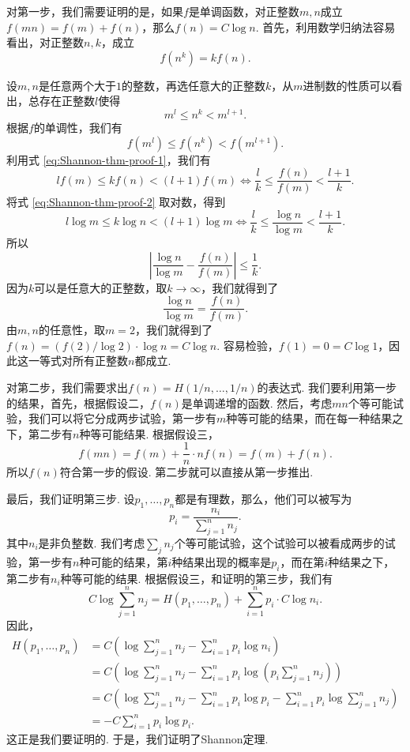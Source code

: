 对第一步，我们需要证明的是，如果$f$是单调函数，对正整数$m,n$成立$f(mn)=f(m)+f(n)$，那么$f(n)=C\log n$. 首先，利用数学归纳法容易看出，对正整数$n,k$，成立
\begin{equation}
    f(n^k)=kf(n).\label{eq:Shannon-thm-proof-1}
\end{equation}

设$m,n$是任意两个大于$1$的整数，再选任意大的正整数$k$，从$m$进制数的性质可以看出，总存在正整数$l$使得
\begin{equation}
    m^l\leq n^k < m^{l+1}.\label{eq:Shannon-thm-proof-2}
\end{equation}
根据$f$的单调性，我们有
\[
    f(m^l)\leq f(n^k) < f(m^{l+1}).
\]
利用式 \eqref{eq:Shannon-thm-proof-1}，我们有
\[
    lf(m)\leq kf(n) < (l+1)f(m)\iff \frac{l}{k}\leq \frac{f(n)}{f(m)} < \frac{l+1}{k}.
\]
将式 \eqref{eq:Shannon-thm-proof-2} 取对数，得到
\[
    l\log m\leq k\log n < (l+1)\log m\iff \frac{l}{k}\leq \frac{\log n}{\log m} < \frac{l+1}{k}.
\]
所以
\[
    \left|\frac{\log n}{\log m}-\frac{f(n)}{f(m)}\right|\leq\frac1k.
\]
因为$k$可以是任意大的正整数，取$k\to\infty$，我们就得到了
\[
    \frac{\log n}{\log m}=\frac{f(n)}{f(m)}.
\]
由$m,n$的任意性，取$m=2$，我们就得到了$f(n)=(f(2)/\log 2)\cdot \log n= C\log n$. 容易检验，$f(1)=0=C\log 1$，因此这一等式对所有正整数$n$都成立.

对第二步，我们需要求出$f(n)=H(1/n,\dots,1/n)$的表达式. 我们要利用第一步的结果，首先，根据假设二，$f(n)$是单调递增的函数. 然后，考虑$mn$个等可能试验，我们可以将它分成两步试验，第一步有$m$种等可能的结果，而在每一种结果之下，第二步有$n$种等可能结果. 根据假设三，
\[
f(mn)=f(m)+\frac{1}{n}\cdot nf(n)=f(m)+f(n).    
\]
所以$f(n)$符合第一步的假设. 第二步就可以直接从第一步推出.

最后，我们证明第三步. 设$p_1,\dots,p_n$都是有理数，那么，他们可以被写为
\[
    p_i=\frac{n_i}{\sum_{j=1}^n n_j}.
\]
其中$n_i$是非负整数. 我们考虑$\sum_j n_j$个等可能试验，这个试验可以被看成两步的试验，第一步有$n$种可能的结果，第$i$种结果出现的概率是$p_i$，而在第$i$种结果之下，第二步有$n_i$种等可能的结果. 根据假设三，和证明的第三步，我们有
\[
   C\log\sum_{j=1}^nn_j=H(p_1,\dots,p_n)+\sum_{i=1}^n p_i\cdot C\log n_i.
\]
因此，
\begin{align*}
    H(p_1,\dots,p_n)&=C\left(\log\sum_{j=1}^nn_j-\sum_{i=1}^n p_i\log n_i\right)\\
    &=C\left(\log\sum_{j=1}^nn_j-\sum_{i=1}^n p_i\log\left(p_i\sum_{j=1}^n n_j\right)\right)\\
    &=C\left(\log\sum_{j=1}^nn_j-\sum_{i=1}^n p_i\log p_i-\sum_{i=1}^n p_i\log\sum_{j=1}^n n_j\right)\\
    &=-C\sum_{i=1}^n p_i\log p_i.
\end{align*}
这正是我们要证明的. 于是，我们证明了Shannon定理.

